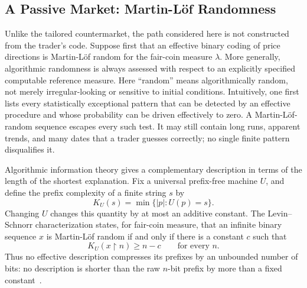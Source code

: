 \documentclass[aps,pra,reprint,superscriptaddress,amsmath,amssymb,floatfix]{revtex4-2}
\theoremstyle{plain}
\theoremstyle{definition}
\theoremstyle{remark}
\begin{document}
\subsection{A Passive Market: Martin-L\"of Randomness}

Unlike the tailored countermarket, the path considered here is not constructed
from the trader's code. Suppose first that an effective binary coding of price
directions is Martin-L\"of random for the fair-coin measure \(\lambda\). More
generally, algorithmic randomness is always assessed with respect to an
explicitly specified computable reference measure. Here ``random'' means
algorithmically random, not merely irregular-looking or sensitive to initial
conditions. Intuitively, one first lists every
statistically exceptional pattern that can be detected by an effective
procedure and whose probability can be driven effectively to zero. A
Martin-L\"of-random sequence escapes every such test. It may still contain long
runs, apparent trends, and many dates that a trader guesses correctly; no
single finite pattern disqualifies it.

Algorithmic information theory gives a complementary description in terms of
the length of the shortest explanation. Fix a universal prefix-free machine
\(U\), and define the prefix complexity of a finite string \(s\) by
\begin{equation}
  K_U(s)=\min\{|p|:U(p)=s\}.
  \label{eq:prefixcomplexity}
\end{equation}
Changing \(U\) changes this quantity by at most an additive constant. The
Levin--Schnorr characterization states, for fair-coin measure, that an infinite
binary sequence \(x\) is Martin-L\"of random if and only if there is a constant
\(c\) such that
\begin{equation}
  K_U(x{\upharpoonright}n)\geq n-c
  \qquad\text{for every }n.
  \label{eq:levinschnorr}
\end{equation}
Thus no effective description compresses its prefixes by an unbounded number
of bits: no description is shorter than the raw \(n\)-bit prefix by more than
a fixed constant~\cite{Chaitin-1974,calude:02,Nies2009}.
\end{document}
